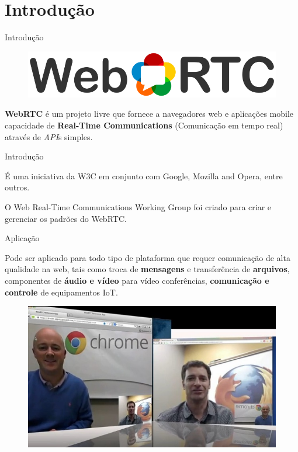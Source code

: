 \section{Introdução}\label{introduuxe7uxe3o}

\begin{frame}{Introdução}

\begin{figure}[h]
    \includegraphics[scale=0.5]{img/webrtc-logo-horiz-retro-750x140.png}
\end{figure}

\textbf{WebRTC} é um projeto livre que fornece a navegadores web e
aplicações mobile capacidade de \textbf{Real-Time Communications}
(Comunicação em tempo real) através de \emph{API}s simples.

\end{frame}

\begin{frame}{Introdução}

É uma iniciativa da W3C em conjunto com Google, Mozilla and Opera, entre
outros.

O Web Real-Time Communications Working Group foi criado para criar e
gerenciar os padrões do WebRTC.

\end{frame}

\begin{frame}{Aplicação}

Pode ser aplicado para todo tipo de plataforma que requer comunicação de
alta qualidade na web, tais como troca de \textbf{mensagens} e
transferência de \textbf{arquivos}, componentes de \textbf{áudio e
vídeo} para vídeo conferências, \textbf{comunicação e controle} de
equipamentos IoT.

\begin{figure}[h]
    \includegraphics[scale=0.35]{img/firefox-chrome-webrtc.jpg}
\end{figure}

\end{frame}


